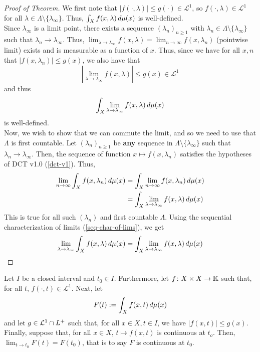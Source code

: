 \documentclass[11pt,leqno,oneside]{amsbook}
\numberwithin{thm}{section}
\newcommand{\cL}{\mathcal{L}}
\newcommand{\K}{\mathbb{K}} %
\renewcommand{\de}{\textbf} %
\begin{document}
\begin{proof}[Proof of Theorem]
  We first note that \(|f(\cdot,\lambda)| \leq g(\cdot) \in \cL^1\),
  so \(f(\cdot, \lambda) \in \cL^1\) for all \(\lambda \in \Lambda
  \setminus \{\lambda_\infty\}\). Thus, \(\int_X f(x,\lambda) \, d
  \mu(x)\) is well-defined. \\

  Since \(\lambda_\infty\) is a limit point, there exists a sequence
  \((\lambda_n)_{n \geq 1}\) with \(\lambda_n \in \Lambda \setminus
  \{\lambda_\infty\}\) such that \(\lambda_n \to
  \lambda_\infty\). Thus, \(\lim_{\lambda \to \lambda_\infty}
  f(x,\lambda) = \lim_{n \to \infty} f(x,\lambda_n)\) (pointwise
  limit) exists and is measurable as a function of \(x\). Thus, since
  we have for all \(x,n\) that \(|f(x,\lambda_n)| \leq g(x)\), we also
  have that \[
   \left|  \lim_{\lambda \to \lambda_\infty} f(x,\lambda) \right| \leq
   g(x) \in \cL^1
  \]
  and thus\[
    \int_X \lim_{\lambda \to \lambda_\infty} f(x,\lambda) \, d \mu(x)
  \]
  is well-defined. \\

  Now, we wish to show that we can commute the limit, and so we need
  to use that \(\Lambda\) is first countable. Let \((\lambda_n)_{n
    \geq 1}\) be \de{any} sequence in \(\Lambda \setminus
  \{\lambda_\infty\}\) such that \(\lambda_n \to
  \lambda_\infty\). Then, the sequence of function \(x \mapsto
  f(x,\lambda_n)\) satisfies the hypotheses of DCT v1.0
  (\ref{dct-v1}). Thus,
  \begin{align*}
    \lim_{n \to \infty} \int_X f(x,\lambda_n) \, d \mu(x)
    & = \int_X \lim_{n \to \infty} f(x,\lambda_n) \, d \mu(x) \\
    & = \int_X \lim_{\lambda \to \lambda_\infty} f(x,\lambda) \, d \mu(x)
  \end{align*}
  This is true for all such \((\lambda_n)\) and first countable
  \(\Lambda\). Using the sequential characterization of limits
  (\ref{seq-char-of-lims}), we get \[
    \lim_{\lambda \to \lambda_\infty} \int_X f(x,\lambda) \, d \mu(x) =
    \int_X \lim_{\lambda \to \lambda_\infty} f(x,\lambda) \, d \mu(x)
  \]
\end{proof}
\begin{cor}
  Let \(I\) be a closed interval and \(t_0 \in I\). Furthermore, let
  \(f \from X \times X \to \K\) such that, for all \(t\), \(f(\cdot,t)
  \in \cL^1\). Next, let \[
    F(t) := \int_X f(x,t) \, d\mu(x)
  \]
  and let \(g \in \cL^1 \intersect L^+\) such that, for all \(x \in X,
  t \in I\), we have \(|f(x,t)| \leq g(x)\). Finally, suppose that,
  for all \(x \in X\), \(t \mapsto f(x,t)\) is continuous at
  \(t_o\). Then, \(\lim_{t \to t_0} F(t) = F(t_0)\), that is to say
  \(F\) is continuous at \(t_0\).
\end{cor}
\end{document}
